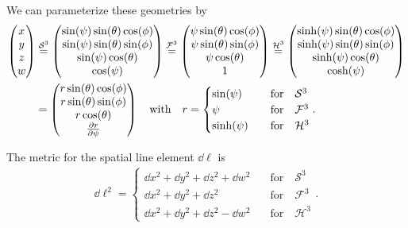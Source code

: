 \noindent We can parameterize these geometries by
\begin{align}
    \begin{pmatrix} x \\ y \\ z \\ w \end{pmatrix} &\overset{\mathcal{S}^{3}}{=} \begin{pmatrix} \sin(\psi) \sin(\theta) \cos(\phi) \\ \sin(\psi) \sin(\theta) \sin(\phi) \\ \sin(\psi) \cos(\theta) \\ \cos(\psi) \end{pmatrix} \overset{\mathcal{F}^{3}}{=} \begin{pmatrix}  \psi \sin(\theta) \cos(\phi) \\ \psi \sin(\theta) \sin(\phi) \\ \psi \cos(\theta) \\ 1 \end{pmatrix} \overset{\mathcal{H}^3}{=} \begin{pmatrix} \sinh(\psi) \sin(\theta) \cos(\phi) \\ \sinh(\psi) \sin(\theta) \sin(\phi) \\ \sinh(\psi) \cos(\theta) \\ \cosh(\psi) \end{pmatrix} \nonumber \\
                                                   &= \begin{pmatrix} r \sin(\theta) \cos(\phi) \\ r \sin(\theta) \sin(\phi) \\ r \cos(\theta) \\ \pdv{r}{\psi} \end{pmatrix} \quad \text{with} \quad r = \begin{cases} \sin(\psi) \quad &\text{for} \quad \mathcal{S}^{3} \\ \psi \quad &\text{for} \quad \mathcal{F}^{3} \\ \sinh(\psi) \quad &\text{for} \quad \mathcal{H}^{3} \end{cases}. \label{eq:geometry}
\end{align}

\noindent The metric for the spatial line element $\dd{\ell}$ is 
\begin{align}
    \dd{\ell}^2 = \begin{cases} 
                    \dd{x}^2 + \dd{y}^2 + \dd{z}^2 + \dd{w}^2 \quad &\text{for} \quad \mathcal{S}^{3} \\ 
                    \dd{x}^2 + \dd{y}^2 + \dd{z}^2 \quad &\text{for} \quad \mathcal{F}^{3} \\ 
                    \dd{x}^2 + \dd{y}^2 + \dd{z}^2 - \dd{w}^{2} \quad &\text{for} \quad \mathcal{H}^{3} 
                  \end{cases}. \label{eq:spatial-metric}
\end{align}

